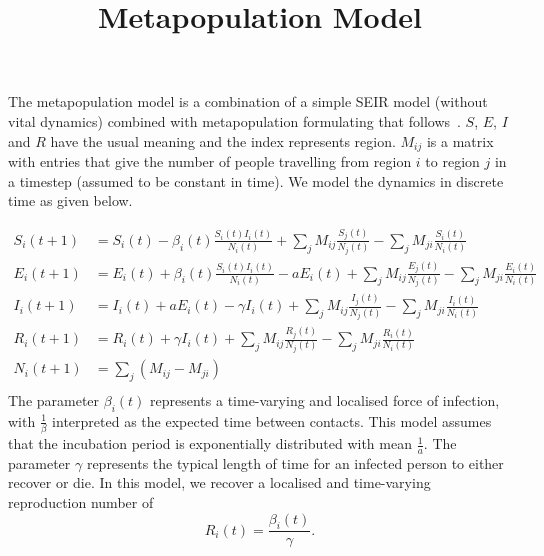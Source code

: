 \documentclass[10pt]{article}
\title{Metapopulation Model}
\begin{document}
\maketitle

The metapopulation model is a combination of a simple SEIR model (without vital dynamics)
combined with metapopulation formulating that follows~\cite{Li490}.
$S$, $E$, $I$ and $R$ have the usual meaning and the index represents region.
$M_{ij}$ is a matrix with entries that give the number of people travelling from region $i$ 
to region $j$ in a timestep (assumed to be constant in time).
We model the dynamics in discrete time as given below.

\begin{align*}
    S_i(t+1) &= S_i(t) -\beta_i(t)  \frac{S_i(t) I_i(t)}{N_i(t)} + \sum_{j} M_{ij} \frac{S_j(t)}{N_j(t)} - \sum_{j} M_{ji} \frac{S_i(t)}{N_i(t)}\\
    E_i(t+1) &= E_i(t) +\beta_i(t)  \frac{S_i(t) I_i(t) }{N_i(t)} - a E_i(t) + \sum_{j} M_{ij} \frac{E_j(t)}{N_j(t)} - \sum_{j} M_{ji} \frac{E_i(t)}{N_i(t)}\\
    I_i(t+1) &= I_i(t) + a E_i(t) - \gamma I_i(t) + \sum_{j} M_{ij} \frac{I_j(t)}{N_j(t)} - \sum_{j} M_{ji} \frac{I_i(t)}{N_i(t)}\\
    R_i(t+1) &= R_i(t) + \gamma I_i(t) + \sum_{j} M_{ij} \frac{R_j(t)}{N_j(t)} - \sum_{j} M_{ji} \frac{R_i(t)}{N_i(t)}\\
    N_i(t+1) &=  \sum_{j} (M_{ij} - M_{ji}) \\
\end{align*}
The parameter $\beta_i(t)$ represents a time-varying and localised force of infection,
with $\frac{1}{\beta}$ interpreted as the expected time between contacts.
This model assumes that the incubation period is exponentially distributed
with mean $\frac{1}{a}$.
The parameter $\gamma$ represents the typical length of time for an infected person to 
either recover or die.
In this model, we recover a localised and time-varying reproduction number of
\[
    R_i(t) = \frac{\beta_i(t)}{\gamma}  .
\]


\clearpage


\end{document}
